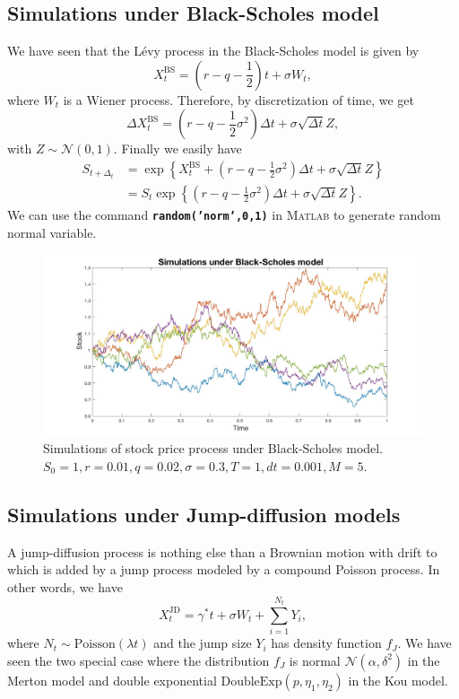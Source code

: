\subsection{Simulations under Black-Scholes model}
We have seen that the L\'evy process in the Black-Scholes model is given by
$$X_t^\text{BS} = \left(r-q-\frac{1}{2}\right)t +\sigma W_t,$$
where $W_t$ is a Wiener process. Therefore, by discretization of time, we get
$$\Delta X_t^\text{BS}=\left(r-q-\frac{1}{2}\sigma^2\right)\Delta t+\sigma \sqrt{\Delta t}Z,$$
with $Z\sim\mathcal{N}(0,1)$. Finally we easily have
\begin{align*}
S_{t+\Delta_t} &= \exp\left\{X_t^\text{BS}+\left(r-q-\frac{1}{2}\sigma^2\right)\Delta t+\sigma\sqrt{\Delta t}Z\right\}\\
&= S_t\exp\left\{\left(r-q-\frac{1}{2}\sigma^2\right)\Delta t+\sigma\sqrt{\Delta t}Z\right\}.
\end{align*}
We can use the command \textbf{\texttt{random('norm',0,1)}} in \textsc{Matlab} to generate random normal variable.
\begin{figure}[!htb]
	\includegraphics[width=\textwidth]{gfx/BS_plot}
	\caption{Simulations of stock price process under Black-Scholes model.\\ $S_0=1, r= 0.01,q = 0.02, \sigma=0.3, T = 1, dt = 0.001, M=5$.}
	\label{fig:MC:BS}
\end{figure}

\subsection{Simulations under Jump-diffusion models}
A jump-diffusion process is nothing else than a Brownian motion with drift to which is added by a jump process modeled by a compound Poisson process. In other words, we have
$$X_t^\text{JD} = \gamma^\ast t + \sigma W_t + \sum_{i=1}^{N_t}Y_i,$$
where $N_t\sim\text{Poisson}(\lambda t)$ and the jump size $Y_i$ has density function $f_J$. We have seen the two special case where the distribution $f_J$ is normal $\mathcal{N}(\alpha,\delta^2)$ in the Merton model and double exponential $\text{DoubleExp}(p,\eta_1,\eta_2)$ in the Kou model.

